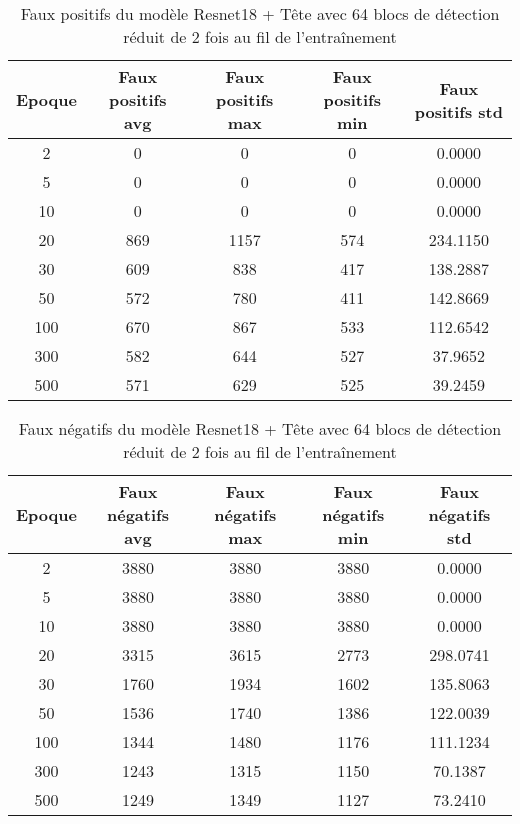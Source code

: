 \begin{table}[!ht]
    \caption{Faux positifs du modèle Resnet18 + Tête avec 64 blocs de détection réduit de 2 fois au fil de l'entraînement}
    \label{tab:resnet18+head_64n_false_positive_reduced_2x_precision}
    \centering
    \begin{tabular}{ |c||c|c|c|c|  }
        \hline
        \rowcolor{gray!50}
        Epoque & Faux positifs avg & Faux positifs max & Faux positifs min & Faux positifs std\\
        \hline
        2 & 0 & 0 & 0 & 0.0000\\
        5 & 0 & 0 & 0 & 0.0000\\
        10 & 0 & 0 & 0 & 0.0000\\
        20 & 869 & 1157 & 574 & 234.1150\\
        30 & 609 & 838 & 417 & 138.2887\\
        50 & 572 & 780 & 411 & 142.8669\\
        100 & 670 & 867 & 533 & 112.6542\\
        300 & 582 & 644 & 527 & 37.9652\\
        500 & 571 & 629 & 525 & 39.2459\\
        \hline
    \end{tabular}
\end{table}

\begin{table}[!ht]
    \caption{Faux négatifs du modèle Resnet18 + Tête avec 64 blocs de détection réduit de 2 fois au fil de l'entraînement}
    \label{tab:resnet18+head_64n_false_negative_reduced_2x_precision}
    \centering
    \begin{tabular}{ |c||c|c|c|c|  }
        \hline
        \rowcolor{gray!50}
        Epoque & Faux négatifs avg & Faux négatifs max & Faux négatifs min & Faux négatifs std\\
        \hline
        2 & 3880 & 3880 & 3880 & 0.0000\\
        5 & 3880 & 3880 & 3880 & 0.0000\\
        10 & 3880 & 3880 & 3880 & 0.0000\\
        20 & 3315 & 3615 & 2773 & 298.0741\\
        30 & 1760 & 1934 & 1602 & 135.8063\\
        50 & 1536 & 1740 & 1386 & 122.0039\\
        100 & 1344 & 1480 & 1176 & 111.1234\\
        300 & 1243 & 1315 & 1150 & 70.1387\\
        500 & 1249 & 1349 & 1127 & 73.2410\\
        \hline
    \end{tabular}
\end{table}

